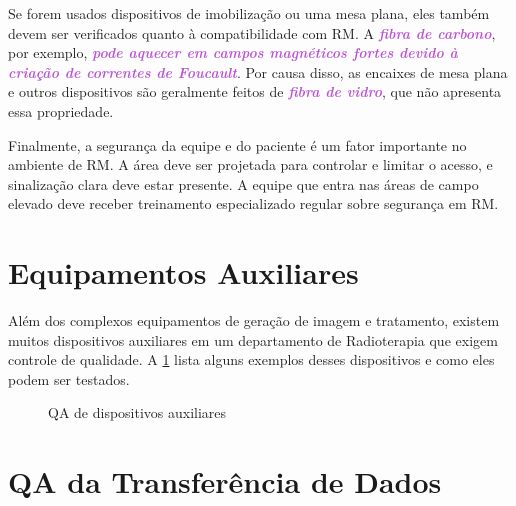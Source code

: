 \documentclass[11pt,a4paper]{article}
\newcounter{exemplo}
\begin{document}
	Se forem usados dispositivos de imobilização ou uma mesa plana, eles também devem ser verificados quanto à compatibilidade com RM. A \textcolor{MediumOrchid}{\textbf{\textit{fibra de carbono}}}, por exemplo, \textcolor{MediumOrchid}{\textbf{\textit{pode aquecer em campos magnéticos fortes devido à criação de correntes de Foucault}}}. Por causa disso, as encaixes de mesa plana e outros dispositivos são geralmente feitos de \textcolor{MediumOrchid}{\textbf{\textit{fibra de vidro}}}, que não apresenta essa propriedade.

	Finalmente, a segurança da equipe e do paciente é um fator importante no ambiente de RM. A área deve ser projetada para controlar e limitar o acesso, e sinalização clara deve estar presente. A equipe que entra nas áreas de campo elevado deve receber treinamento especializado regular sobre segurança em RM.

\section{Equipamentos Auxiliares}

	Além dos complexos equipamentos de geração de imagem e tratamento, existem muitos dispositivos auxiliares em um departamento de Radioterapia que exigem controle de qualidade. A \ref{fig:dispAux} lista alguns exemplos desses dispositivos e como eles podem ser testados.

	\begin{figure}[!h]
		\centering
		\caption{QA de dispositivos auxiliares}
		\label{fig:dispAux}
	\end{figure}

\section{QA da Transferência de Dados}
\end{document}
